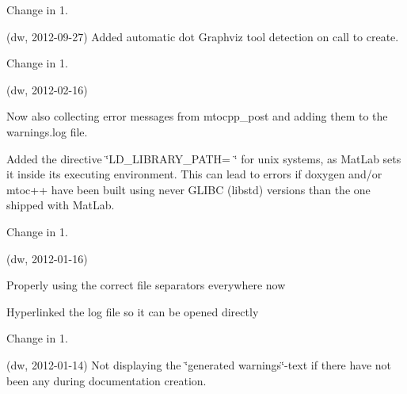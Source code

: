 \begin{DoxyRefDesc}{Change in 1.}
\item[\hyperlink{changelog1_4__changelog1_4000002}{Change in 1.\+4}](dw, 2012-\/09-\/27) Added automatic dot Graphviz tool detection on call to create.\end{DoxyRefDesc}


\begin{DoxyRefDesc}{Change in 1.}
\item[\hyperlink{changelog1_3__changelog1_3000001}{Change in 1.\+3}](dw, 2012-\/02-\/16)
\begin{DoxyItemize}
\item Now also collecting error messages from mtocpp\+\_\+post and adding them to the warnings.\+log file.
\item Added the directive \char`\"{}\+L\+D\+\_\+\+L\+I\+B\+R\+A\+R\+Y\+\_\+\+P\+A\+T\+H= \char`\"{} for unix systems, as Mat\+Lab sets it inside its executing environment. This can lead to errors if doxygen and/or mtoc++ have been built using never G\+L\+I\+BC (libstd) versions than the one shipped with Mat\+Lab.
\end{DoxyItemize}\end{DoxyRefDesc}


\begin{DoxyRefDesc}{Change in 1.}
\item[\hyperlink{changelog1_3__changelog1_3000002}{Change in 1.\+3}](dw, 2012-\/01-\/16)
\begin{DoxyItemize}
\item Properly using the correct file separators everywhere now
\item Hyperlinked the log file so it can be opened directly
\end{DoxyItemize}\end{DoxyRefDesc}


\begin{DoxyRefDesc}{Change in 1.}
\item[\hyperlink{changelog1_3__changelog1_3000003}{Change in 1.\+3}](dw, 2012-\/01-\/14) Not displaying the \char`\"{}generated warnings\char`\"{}-\/text if there have not been any during documentation creation.\end{DoxyRefDesc}


